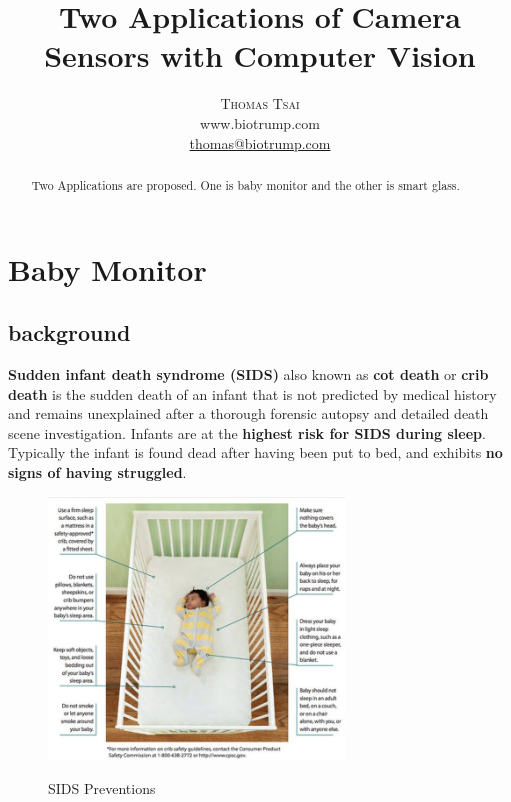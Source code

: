 \documentclass[a4paper,10pt]{report}
\title{\vspace{-15mm}\fontsize{24pt}{10pt}\selectfont\textbf{Two Applications of Camera Sensors with Computer Vision}} %
\author{
\large
\textsc{Thomas Tsai}\\[2mm] %
\normalsize www.biotrump.com \\ %
\normalsize \href{mailto:thomas@biotrump.com}{thomas@biotrump.com} %
\vspace{-5mm}
}
\date{}
\begin{document}
\maketitle

\begin{abstract}
Two Applications are proposed. One is baby monitor and the other is smart glass.

\end{abstract}

\chapter{Baby Monitor}
\section {background}
\textbf{Sudden infant death syndrome (SIDS)} also known as \textbf{cot death} or
\textbf{crib death} is the sudden death of an infant that is not predicted by
medical history and remains unexplained after a thorough forensic autopsy and
detailed death scene investigation. Infants are at the \textbf{highest risk for
SIDS during sleep}. Typically the infant is found dead after having been put
to bed, and exhibits \textbf{no signs of having struggled}.\cite{wiki-SIDS}\\

\begin{figure}[h]
  \centering
	\includegraphics[width=0.7\textwidth, keepaspectratio=true]{baby-sids-prevention}
  \caption{SIDS Preventions}\cite{SIDS-healthystartorange}
  \label{fig:sids}
\end{figure}
\end{document}
